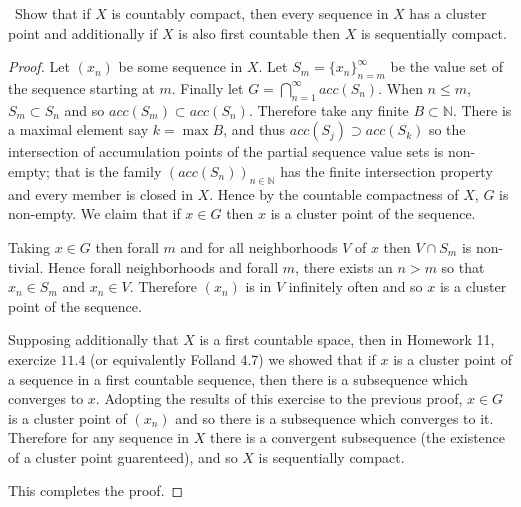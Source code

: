 \documentclass[11pt]{amsart}
\theoremstyle{definition}
\numberwithin{theorem}{section}
\numberwithin{definition}{section}
\numberwithin{equation}{section}
\begin{document}
\medskip {}\ Show that if $X$ is countably compact, then every sequence in $X$ has a cluster point and additionally if $X$ is also first countable then $X$ is sequentially compact.
\begin{proof}
	Let $(x_n)$ be some sequence in $X$. Let $S_m = \{x_n\}_{n=m}^\infty$ be the value set of the sequence starting at $m$. Finally let $G = \bigcap_{n=1}^\infty acc(S_n).$  When $n \leq m$, $S_m \subset S_n$ and so $acc(S_m) \subset acc(S_n)$. Therefore take any finite $B \subset\mathbb{N}.$ There is a maximal element say $k = \max B$, and thus $acc(S_j) \supset acc(S_k)$ so the intersection of accumulation points of the partial sequence value sets is non-empty; that is the family $(acc(S_n))_{n\in \mathbb{N}}$ has the finite intersection property and every member is closed in $X$. Hence by the countable compactness of $X$, $G$ is non-empty. We claim that if $x \in G$ then $x$ is a cluster point of the sequence.

	Taking $x \in G$ then forall $m$ and for all neighborhoods $V$ of $x$ then $V \cap S_m$ is non-tivial. Hence forall neighborhoods and forall $m$, there exists an $n > m$ so that $x_n \in S_m$ and $x_n \in V$. Therefore $(x_n)$ is in $V$ infinitely often and so $x$ is a cluster point of the sequence.

	Supposing additionally that $X$ is a first countable space, then in Homework 11, exercize $11.4$ (or equivalently Folland 4.7) we showed that if $x$ is a cluster point of a sequence in a first countable sequence, then there is a subsequence which converges to $x$. Adopting the results of this exercise to the previous proof, $x \in G$ is a cluster point of $(x_n)$ and so there is a subsequence which converges to it. Therefore for any sequence in $X$ there is a convergent subsequence (the existence of a cluster point guarenteed), and so $X$ is sequentially compact.

	This completes the proof.
\end{proof}
\end{document}
